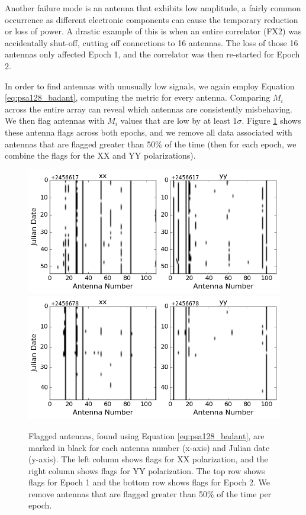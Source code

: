 Another failure mode is an antenna that exhibits low amplitude, a fairly common occurrence as different electronic components can cause the temporary reduction or loss of power. A drastic example of this is when an entire correlator (FX2) was accidentally shut-off, cutting off connections to 16 antennas. The loss of those 16 antennas only affected Epoch 1, and the correlator was then re-started for Epoch 2. 

In order to find antennas with unusually low signals, we again employ Equation \eqref{eq:psa128_badant}, computing the metric for every antenna. Comparing $M_{i}$ across the entire array can reveal which antennas are consistently misbehaving. We then flag antennas with $M_{i}$ values that are low by at least $1\sigma$. Figure \ref{fig:psa128_badants} shows these antenna flags across both epochs, and we remove all data associated with antennas that are flagged greater than 50\% of the time (then for each epoch, we combine the flags for the XX and YY polarizations).

\begin{figure}
	\centering
	\includegraphics[trim={0cm 0cm 0cm 0cm},clip,height=0.35\textwidth]{plots/psa128_badants_S1E1.png}
	\includegraphics[trim={0cm 0cm 0cm 0cm},clip,height=0.35\textwidth]{plots/psa128_badants_S1E2.png}
	\caption{Flagged antennas, found using Equation \eqref{eq:psa128_badant}, are marked in black for each antenna number (x-axis) and Julian date (y-axis). The left column shows flags for XX polarization, and the right column shows flags for YY polarization. The top row shows flags for Epoch 1 and the bottom row shows flags for Epoch 2. We remove antennas that are flagged greater than 50\% of the time per epoch.}
	\label{fig:psa128_badants}
\end{figure}

